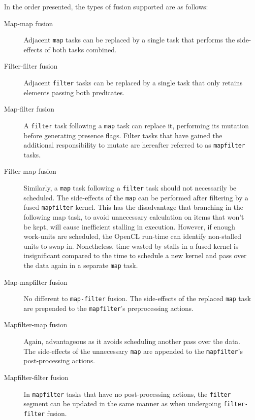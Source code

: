 In the order presented, the types of fusion supported are as follows:
\begin{description}
\item[Map-map fusion] Adjacent \verb|map| tasks can be replaced by a single task that performs the side-effects of both tasks combined.

\item[Filter-filter fusion] Adjacent \verb|filter| tasks can be replaced by a single task that only retains elements passing both predicates.

\item[Map-filter fusion] A \verb|filter| task following a \verb|map| task can replace it, performing its mutation before generating presence flags. Filter tasks that have gained the additional responsibility to mutate are hereafter referred to as \verb|mapfilter| tasks.

\item[Filter-map fusion] Similarly, a \verb|map| task following a \verb|filter| task should not necessarily be scheduled. The side-effects of the \verb|map| can be performed after filtering by a fused \verb|mapfilter| kernel. This has the disadvantage that branching in the following map task, to avoid unnecessary calculation on items that won't be kept, will cause inefficient stalling in execution. However, if enough work-units are scheduled, the \ac{OpenCL} run-time can identify non-stalled units to swap-in. Nonetheless, time wasted by stalls in a fused kernel is insignificant compared to the time to schedule a new kernel and pass over the data again in a separate \verb|map| task.

\item[Map-mapfilter fusion] No different to \verb|map-filter| fusion. The side-effects of the replaced \verb|map| task are prepended to the \verb|mapfilter|'s preprocessing actions.

\item[Mapfilter-map fusion] Again, advantageous as it avoids scheduling another pass over the data. The side-effects of the unnecessary \verb|map| are appended to the \verb|mapfilter|'s post-processing actions.

\item[Mapfilter-filter fusion] In \verb|mapfilter| tasks that have no post-processing actions, the \verb|filter| segment can be updated in the same manner as when undergoing \verb|filter-filter| fusion.
\end{description}

